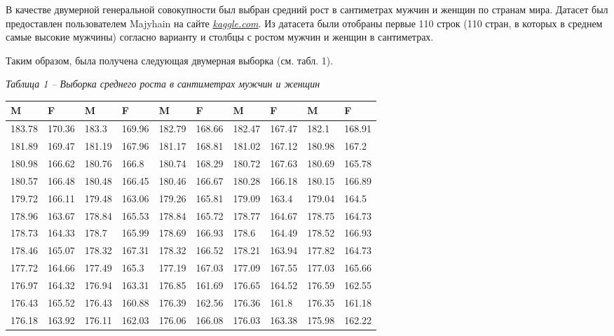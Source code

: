 В качестве двумерной генеральной совокупности был выбран средний рост в сантиметрах
мужчин и женщин по странам мира.
Датасет был предоставлен пользователем Majyhain на сайте \textit{\href{kaggle.com}{kaggle.com}}.
Из датасета были отобраны первые 110 строк (110 стран, в которых в среднем самые высокие мужчины) согласно варианту и
столбцы с ростом мужчин и женщин в сантиметрах.

Таким образом, была получена следующая двумерная выборка (см. табл. 1).

\noindent\textit{Таблица 1 -- Выборка среднего роста в сантиметрах мужчин и женщин}
\begin{longtable}{|p{1.3cm}|p{1.3cm}|p{1.3cm}|p{1.3cm}|p{1.3cm}|p{1.3cm}|p{1.3cm}|p{1.3cm}|p{1.3cm}|p{1.3cm}|}
    \hline
    M      & F      & M      & F      & M      & F      & M      & F      & M      & F      \\\hline
    183.78 & 170.36 & 183.3  & 169.96 & 182.79 & 168.66 & 182.47 & 167.47 & 182.1  & 168.91 \\\hline
    181.89 & 169.47 & 181.19 & 167.96 & 181.17 & 168.81 & 181.02 & 167.12 & 180.98 & 167.2  \\\hline
    180.98 & 166.62 & 180.76 & 166.8  & 180.74 & 168.29 & 180.72 & 167.63 & 180.69 & 165.78 \\\hline
    180.57 & 166.48 & 180.48 & 166.45 & 180.46 & 166.67 & 180.28 & 166.18 & 180.15 & 166.89 \\\hline
    179.72 & 166.11 & 179.48 & 163.06 & 179.26 & 165.81 & 179.09 & 163.4  & 179.04 & 164.5  \\\hline
    178.96 & 163.67 & 178.84 & 165.53 & 178.84 & 165.72 & 178.77 & 164.67 & 178.75 & 164.73 \\\hline
    178.73 & 164.33 & 178.7  & 165.99 & 178.69 & 166.93 & 178.6  & 164.49 & 178.52 & 166.93 \\\hline
    178.46 & 165.07 & 178.32 & 167.31 & 178.32 & 166.52 & 178.21 & 163.94 & 177.82 & 164.73 \\\hline
    177.72 & 164.66 & 177.49 & 165.3  & 177.19 & 167.03 & 177.09 & 167.55 & 177.03 & 165.66 \\\hline
    176.97 & 164.32 & 176.94 & 163.31 & 176.85 & 161.69 & 176.65 & 164.52 & 176.59 & 162.55 \\\hline
    176.43 & 165.52 & 176.43 & 160.88 & 176.39 & 162.56 & 176.36 & 161.8  & 176.35 & 161.18 \\\hline
    176.18 & 163.92 & 176.11 & 162.03 & 176.06 & 166.08 & 176.03 & 163.38 & 175.98 & 162.22 \\\hline

\end{longtable}
